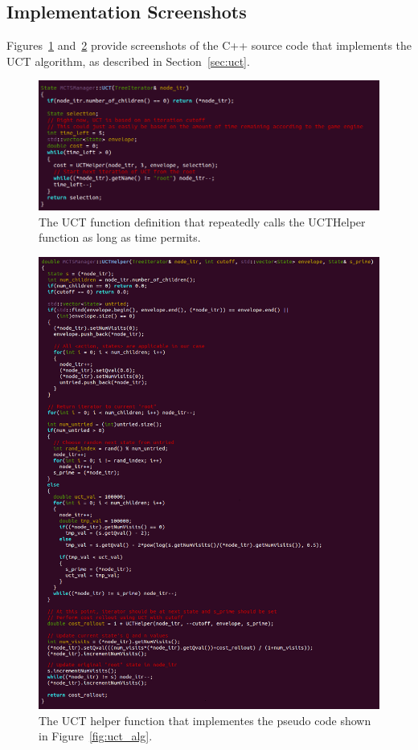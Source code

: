 \documentclass[a4paper,11pt]{article}
\begin{document}



\newpage

\begin{appendices}
\section{Implementation Screenshots}
Figures~\ref{fig:uct_imp} and~\ref{fig:uct_helper_imp} provide screenshots of the C++ source code
that implements the UCT algorithm, as described in Section~\ref{sec:uct}.

%
\begin{figure}[!htbp]
  \centering
  \includegraphics[width=0.71\columnwidth]{uct_implementation}
  \caption{The UCT function definition that repeatedly calls the UCTHelper function as long as time permits.}
  \label{fig:uct_imp}
\end{figure}
%

%
\begin{figure}[!htbp]
  \centering
  \includegraphics[width=0.71\columnwidth]{uct_helper_implementation}
  \caption{The UCT helper function that implementes the pseudo code shown in Figure~\ref{fig:uct_alg}.}
  \label{fig:uct_helper_imp}
\end{figure}
%



\end{appendices}
\end{document}
